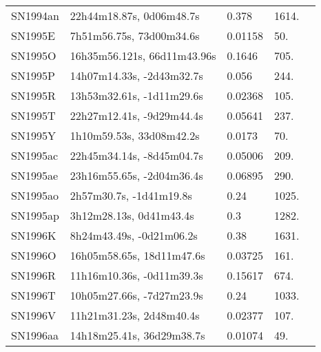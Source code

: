 \begin{longtable}{lllll}
         SN1994an &       22h44m18.87s, 0d06m48.7s &    0.378 &          1614. &    \citet{1999ApJ...517..565P} \\
          SN1995E &       7h51m56.75s, 73d00m34.6s &  0.01158 &            50. &    \citet{1991RC3.9.C...0000d} \\
          SN1995O &    16h35m56.121s, 66d11m43.96s &   0.1646 &           705. &  \citet{1992AandAS...95...87L} \\
          SN1995P &      14h07m14.33s, -2d43m32.7s &    0.056 &           244. &    \citet{1996ApJ...470..172S} \\
          SN1995R &      13h53m32.61s, -1d11m29.6s &  0.02368 &           105. &    \citet{1995AJ....109..874B} \\
          SN1995T &      22h27m12.41s, -9d29m44.4s &  0.05641 &           237. &    \citet{2004SDSS2.C...0000:} \\
          SN1995Y &       1h10m59.53s, 33d08m42.2s &   0.0173 &            70. &    \citet{1999AJ....118.2014W} \\
         SN1995ac &      22h45m34.14s, -8d45m04.7s &  0.05006 &           209. &    \citet{20096dF...C...0000J} \\
         SN1995ae &      23h16m55.65s, -2d04m36.4s &  0.06895 &           290. &    \citet{1995IAUC.6237B...1P} \\
         SN1995ao &        2h57m30.7s, -1d41m19.8s &     0.24 &          1025. &    \citet{1995IAUC.6267A...1K} \\
         SN1995ap &        3h12m28.13s, 0d41m43.4s &      0.3 &          1282. &    \citet{1995IAUC.6267A...1K} \\
          SN1996K &       8h24m43.49s, -0d21m06.2s &     0.38 &          1631. &    \citet{1996IAUC.6332A...1G} \\
          SN1996O &      16h05m58.65s, 18d11m47.6s &  0.03725 &           161. &    \citet{1999AJ....118.1468D} \\
          SN1996R &      11h16m10.36s, -0d11m39.3s &  0.15617 &           674. &    \citet{2003SDSS1.C...0000:} \\
          SN1996T &      10h05m27.66s, -7d27m23.9s &     0.24 &          1033. &    \citet{1996IAUC.6358A...1G} \\
          SN1996V &       11h21m31.23s, 2d48m40.4s &  0.02377 &           107. &  \citet{2005AandA...430..373T} \\
         SN1996aa &      14h18m25.41s, 36d29m38.7s &  0.01074 &            49. &    \citet{2011MNRAS.413..813C} \\

\end{longtable}
